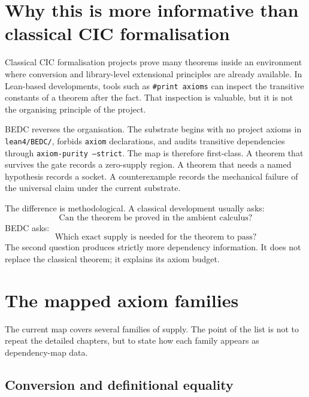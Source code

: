 \section{Why this is more informative than classical CIC formalisation}
\label{sec:bedc-axiom-dependency-map-more-informative}


Classical CIC formalisation projects prove many theorems inside an environment where conversion and library-level extensional principles are already available. In Lean-based developments, tools such as \texttt{\#print axioms} can inspect the transitive constants of a theorem after the fact. That inspection is valuable, but it is not the organising principle of the project.

BEDC reverses the organisation. The substrate begins with no project axioms in \texttt{lean4/BEDC/}, forbids \texttt{axiom} declarations, and audits transitive dependencies through \texttt{axiom-purity --strict}. The map is therefore first-class. A theorem that survives the gate records a zero-supply region. A theorem that needs a named hypothesis records a socket. A counterexample records the mechanical failure of the universal claim under the current substrate.

The difference is methodological. A classical development usually asks:
$$
\text{Can the theorem be proved in the ambient calculus?}
$$
BEDC asks:
$$
\text{Which exact supply is needed for the theorem to pass?}
$$
The second question produces strictly more dependency information. It does not replace the classical theorem; it explains its axiom budget.

\section{The mapped axiom families}
\label{sec:bedc-axiom-dependency-map-taxonomy}

The current map covers several families of supply. The point of the list is not to repeat the detailed chapters, but to state how each family appears as dependency-map data.

\subsection{Conversion and definitional equality}
\label{subsec:bedc-axiom-dependency-map-conversion}

